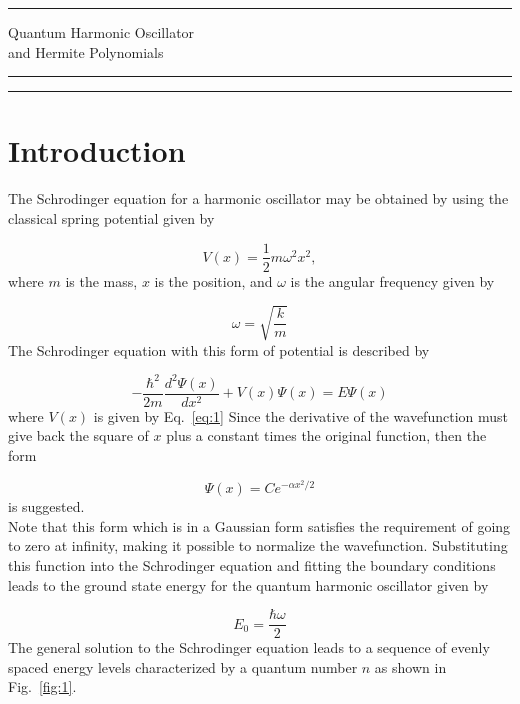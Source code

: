 \documentclass{article}
\begin{document}
\hrule
\begin{center}
\large {Quantum Harmonic Oscillator}\\ \large{and Hermite Polynomials}
\end{center}

\hrule
\vspace{1pt}
\hrule height 1pt

\section{Introduction}

\noindent The Schrodinger equation for a harmonic oscillator may be obtained by using the classical spring potential given by

\begin{equation}
\label{eq:1}
V(x)=\frac{1}{2}m\omega^{2}x^{2},
\end{equation}
where $m$ is the mass, $x$ is the position, and $\omega$ is the angular frequency given by

\begin{equation}
\label{eq:2}
\omega=\sqrt{\frac{k}{m}}
\end{equation}
The Schrodinger equation with this form of potential is described by

\begin{equation}
\label{eq:3}
-\frac{\hbar^{2}}{2m}\frac{d^{2}\Psi(x)}{dx^{2}}+V(x)\Psi(x)=E\Psi(x)
\end{equation}
where $V(x)$ is given by Eq.~\eqref{eq:1} Since the derivative of the wavefunction must give back the square of $x$ plus a constant times the original function, then the form

\begin{equation}
\label{eq:4}
\Psi(x)=Ce^{-\alpha x^{2}/2}
\end{equation}
is suggested.\\

\noindent Note that this form which is in a Gaussian form satisfies the requirement of going to zero at infinity, making it possible to normalize the wavefunction. Substituting this function into the Schrodinger equation and fitting the boundary conditions leads to the ground state energy for the quantum harmonic oscillator given by

\begin{equation}
\label{eq:5}
E_0=\frac{\hbar\omega}{2}
\end{equation}
The general solution to the Schrodinger equation leads to a sequence of evenly spaced energy levels characterized by a quantum number $n$ as shown in Fig.~\ref{fig:1}.
\end{document}
